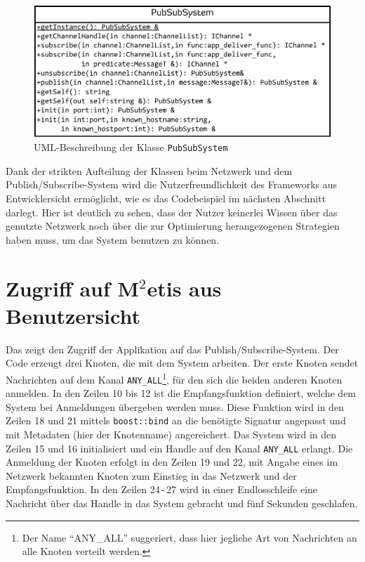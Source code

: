 \begin{figure}[htbp]
\centering
\includegraphics{grafics/uml_pubsubsystem.pdf}
\caption{UML-Beschreibung der Klasse \texttt{PubSubSystem}}
\label{fig:uml_pubsubsystem}
\end{figure}

Dank der strikten Aufteilung der Klassen beim Netzwerk und dem Publish/Subscribe-System wird die Nutzerfreundlichkeit des Frameworks aus Entwicklersicht ermöglicht, wie es das Codebeispiel im nächsten Abschnitt darlegt. Hier ist deutlich zu sehen, dass der Nutzer keinerlei Wissen über das genutzte Netzwerk noch über die zur Optimierung herangezogenen Strategien haben muss, um das System benutzen zu können.

\section{Zugriff auf M$^2$etis aus Benutzersicht}
Das  zeigt den Zugriff der Applikation auf das Publish/Subscribe-System. Der Code erzeugt drei Knoten, die mit dem System arbeiten. Der erste Knoten sendet Nachrichten auf dem Kanal \texttt{ANY\_ALL}\footnote{Der Name \enquote{ANY\_ALL} suggeriert, dass hier jegliche Art von Nachrichten an alle Knoten verteilt werden.}, für den sich die beiden anderen Knoten anmelden. In den Zeilen 10 bis 12 ist die Empfangsfunktion definiert, welche dem System bei Anmeldungen übergeben werden muss. Diese Funktion wird in den Zeilen 18 und 21 mittels \texttt{boost::bind} an die benötigte Signatur angepasst und mit Metadaten (hier der Knotenname) angereichert. Das System wird in den Zeilen 15 und 16 initialisiert und ein Handle auf den Kanal \texttt{ANY\_ALL} erlangt. Die Anmeldung der Knoten erfolgt in den Zeilen 19 und 22, mit Angabe eines im Netzwerk bekannten Knoten zum Einstieg in das Netzwerk und der Empfangsfunktion. In den Zeilen 24\,-\,27 wird in einer Endlosschleife eine Nachricht über das Handle in das System gebracht und fünf Sekunden geschlafen.


